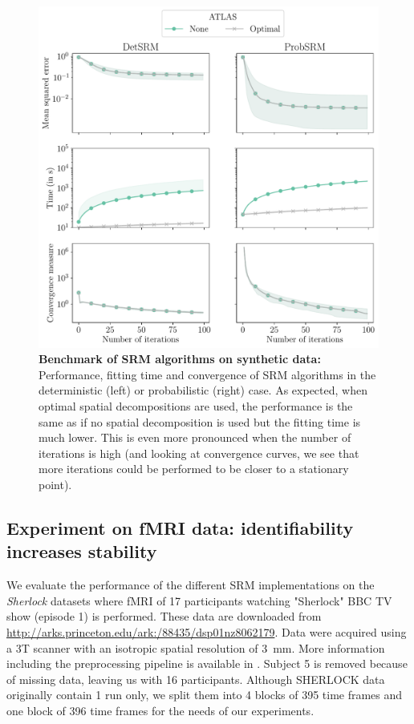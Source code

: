 \documentclass{article}
\begin{document}
\begin{figure}
  \centering
  \includegraphics[width=\textwidth]{../figures/synthetic_gradient.pdf}
  \caption{\textbf{Benchmark of SRM algorithms on synthetic data: } Performance,
    fitting time and convergence of SRM algorithms in the deterministic (left)
    or probabilistic (right) case.
    As expected, when optimal spatial decompositions are used,
    the performance is the same as if no spatial decomposition is used but the fitting time is
    much lower.
    This is even more pronounced when the number of iterations is
    high (and looking at convergence curves, we see that more iterations could
    be performed to be closer to a stationary point).
  }
  \label{fig:srm:synthetic_gradient}
\end{figure}

\subsection{Experiment on fMRI data: identifiability increases stability}
We evaluate the performance of the different SRM implementations on the
\emph{Sherlock} datasets where fMRI of 17 participants watching "Sherlock" BBC
TV show (episode 1) is performed.
%
% 
These data are downloaded from
\url{http://arks.princeton.edu/ark:/88435/dsp01nz8062179}.
%
% 
Data were acquired using a 3T scanner with an isotropic spatial resolution of
3~mm.
%
% 
More information including the preprocessing pipeline is available in
\cite{sherlock}.
%
% 
Subject 5 is removed because of missing data, leaving us with 16 participants.
%
Although SHERLOCK data originally contain 1 run only, we split them into 4 blocks
of 395 time frames and one block of 396 time frames for the needs of our
experiments.
%
\end{document}
